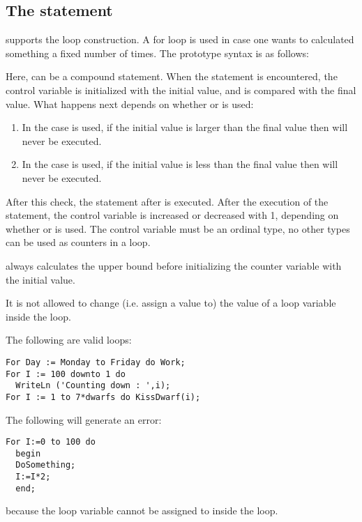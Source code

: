 \subsection{The  statement}
\fpc supports the  loop construction. A for loop is used in case
one wants to calculated something a fixed number of times.
The prototype syntax is as follows:

Here,  can be a compound statement.
When the  statement is encountered, the control variable is initialized with
the initial value, and is compared with the final value.
What happens next depends on whether  or  is used:
\begin{enumerate}
\item In the case  is used, if the initial value is larger than the final
value then  will never be executed.
\item In the case  is used, if the initial value is less than the final
value then  will never be executed.
\end{enumerate}
After this check, the statement after  is executed. After the
execution of the statement, the control variable is increased or decreased
with 1, depending on whether  or  is used.
The control variable must be an ordinal type, no other
types can be used as counters in a loop.

\begin{remark}
\fpc always calculates the upper bound before initializing
the counter variable with the initial value.
\end{remark}

\begin{remark}
It is not allowed to change (i.e. assign a value to) the value of a 
loop variable inside the loop.
\end{remark}

The following are valid loops:
\begin{verbatim}
For Day := Monday to Friday do Work;
For I := 100 downto 1 do
  WriteLn ('Counting down : ',i);
For I := 1 to 7*dwarfs do KissDwarf(i);
\end{verbatim}
The following will generate an error:
\begin{verbatim}
For I:=0 to 100 do
  begin
  DoSomething;
  I:=I*2;
  end;
\end{verbatim}
because the loop variable  cannot be assigned to inside the loop.

